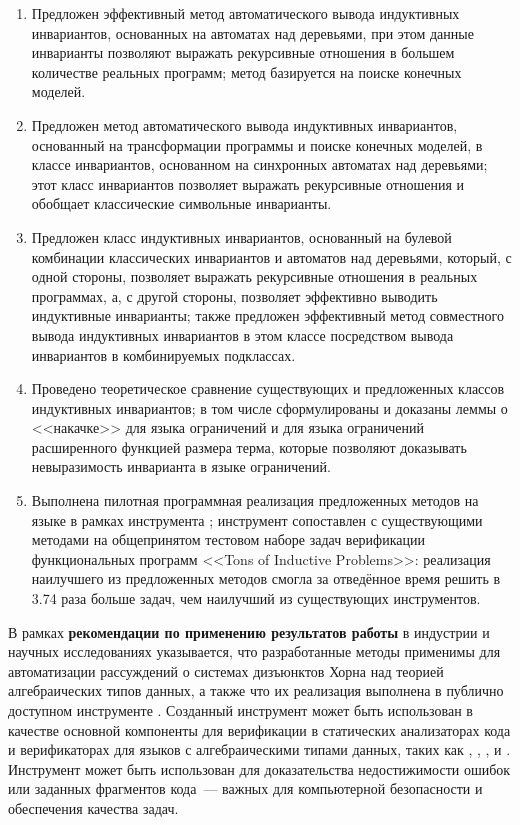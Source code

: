 
\begin{enumerate}
\item Предложен эффективный метод автоматического вывода индуктивных инвариантов, основанных на автоматах над деревьями, при этом данные инварианты позволяют выражать рекурсивные отношения в большем количестве реальных программ; метод базируется на поиске конечных моделей.
\item Предложен метод автоматического вывода индуктивных инвариантов, основанный на трансформации программы и поиске конечных моделей, в классе инвариантов, основанном на синхронных автоматах над деревьями; этот класс инвариантов позволяет выражать рекурсивные отношения и обобщает классические символьные инварианты.
\item Предложен класс индуктивных инвариантов, основанный на булевой комбинации классических инвариантов и автоматов над деревьями, который, с одной стороны, позволяет выражать рекурсивные отношения в реальных программах, а, с другой стороны, позволяет эффективно выводить индуктивные инварианты; также предложен эффективный метод совместного вывода индуктивных инвариантов в этом классе посредством вывода инвариантов в комбинируемых подклассах.
\item Проведено теоретическое сравнение существующих и предложенных классов индуктивных инвариантов; в том числе сформулированы и доказаны леммы о <<накачке>> для языка ограничений и для языка ограничений расширенного функцией размера терма, которые позволяют доказывать невыразимость инварианта в языке ограничений.
\item Выполнена пилотная программная реализация предложенных методов на языке \fsharp{} в рамках инструмента \theringen{}; инструмент сопоставлен с существующими методами на общепринятом тестовом наборе задач верификации функциональных программ <<Tons of Inductive Problems>>: реализация наилучшего из предложенных методов смогла за отведённое время решить в 3.74 раза больше задач, чем наилучший из существующих инструментов.
\end{enumerate}

В рамках \textbf{рекомендации по применению результатов работы} в индустрии и научных исследованиях указывается, что разработанные методы применимы для автоматизации рассуждений о системах дизъюнктов Хорна над теорией алгебраических типов данных, а также что их реализация выполнена в публично доступном инструменте \theringen{}. Созданный инструмент может быть использован в качестве основной компоненты для верификации в статических анализаторах кода и верификаторах для языков с алгебраическими типами данных, таких как \rust{}, \scala{}, \solidity{}, \haskell{} и \ocaml{}. Инструмент может быть использован для доказательства недостижимости ошибок или заданных фрагментов кода~--- важных для компьютерной безопасности и обеспечения качества задач.

